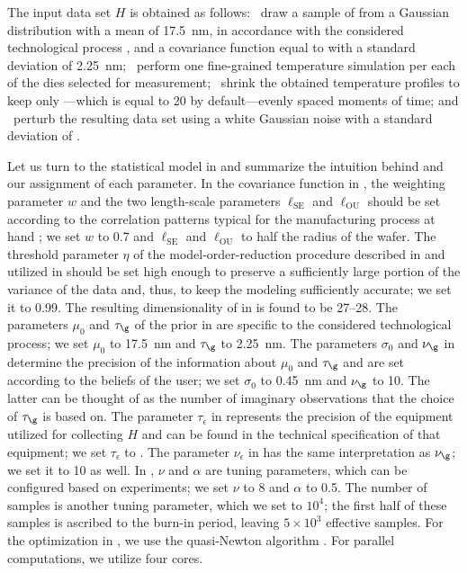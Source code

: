 The input data set $H$ is obtained as follows: \one~draw a sample of \g from a
Gaussian distribution with a mean of 17.5~nm, in accordance with the considered
technological process \cite{ptm}, and a covariance function equal to
 with a standard deviation of 2.25~nm; \two~perform
one fine-grained temperature simulation per each of the \hnd dies selected for
measurement; \three~shrink the obtained temperature profiles to keep only
\ns---which is equal to 20 by default---evenly spaced moments of time; and
\four~perturb the resulting data set using a white Gaussian noise with a
standard deviation of .

Let us turn to the statistical model in  and
summarize the intuition behind and our assignment of each parameter. In the
covariance function in , the weighting parameter $w$
and the two length-scale parameters $\ell_\text{SE}$ and $\ell_\text{OU}$ should
be set according to the correlation patterns typical for the manufacturing
process at hand \cite{chandrakasan2000, cheng2011}; we set $w$ to 0.7 and
$\ell_\text{SE}$ and $\ell_\text{OU}$ to half the radius of the wafer. The
threshold parameter $\eta$ of the model-order-reduction procedure described in
 and utilized in  should be set
high enough to preserve a sufficiently large portion of the variance of the data
and, thus, to keep the modeling sufficiently accurate; we set it to 0.99. The
resulting dimensionality \nz of \vz in  is found to be
27--28. The parameters $\mu_0$ and $\tau_\g$ of the prior in
 are specific to the considered technological process; we
set $\mu_0$ to 17.5~nm and $\tau_\g$ to 2.25~nm. The parameters $\sigma_0$ and
$\nu_\g$ in  determine the precision of the information
about $\mu_0$ and $\tau_\g$ and are set according to the beliefs of the user; we
set $\sigma_0$ to 0.45~nm and $\nu_\g$ to 10. The latter can be thought of as
the number of imaginary observations that the choice of $\tau_\g$ is based on.
The parameter $\tau_\epsilon$ in  represents the precision
of the equipment utilized for collecting $H$ and can be found in the technical
specification of that equipment; we set $\tau_\epsilon$ to . The
parameter $\nu_\epsilon$ in  has the same interpretation
as $\nu_\g$; we set it to 10 as well. In , $\nu$ and
$\alpha$ are tuning parameters, which can be configured based on experiments; we
set $\nu$ to 8 and $\alpha$ to 0.5. The number of samples is another tuning
parameter, which we set to $10^4$; the first half of these samples is ascribed
to the burn-in period, leaving $5 \times 10^3$ effective samples. For the
optimization in , we use the quasi-Newton algorithm
\cite{press2007}. For parallel computations, we utilize four cores.

